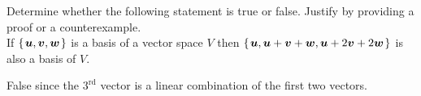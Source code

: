 
\begin{Exercise}[
name={},
title={}, 
difficulty=0,
origin={\cite{BS}}]
Determine whether the following statement is true or false.  Justify by providing 
a proof or a counterexample.\\

If $\mbox{$\left\{\hspace{0.1em}\bm{u}, \bm{v}, \bm{w}\hspace{0.1em}\right\}$}$ is a basis of a vector space $V$ then $\mbox{$\left\{\hspace{0.1em}\bm{u}, \bm{u}+\bm{v}+\bm{w}, \bm{u}+2\bm{v}+2\bm{w}\hspace{0.1em}\right\}$}$ is also a basis of $V$.
\end{Exercise}
\begin{Answer}
False since the $3^{\text{rd}}$ vector is a linear combination of the first two vectors. 
\end{Answer}
